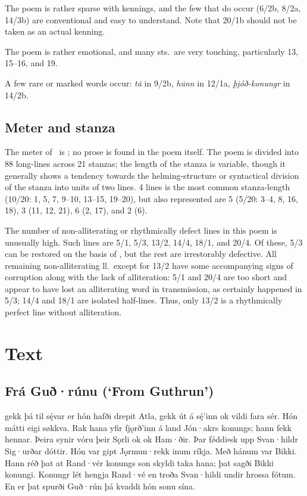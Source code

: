 The poem is rather sparse with kennings, and the few that do occur (6/2b, 8/2a, 14/3b) are conventional and easy to understand.  Note that 20/1b should not be taken as an actual kenning.

The poem is rather emotional, and many sts.~are very touching, particularly 13, 15--16, and 19.

A few rare or marked words occur: \emph{tȧ} in 9/2b, \emph{hu̇nn} in 12/1a, \emph{þjóð-konungr} in 14/2b.

\subsection{Meter and stanza}

The meter of \Gudrunarhvot\ is \Fornyrdislag; no prose is found in the poem itself.  The poem is divided into 88 long-lines across 21 stanzas; the length of the stanza is variable, though it generally shows a tendency towards the helming-structure or syntactical division of the stanza into units of two lines.  4 lines is the most common stanza-length (10/20: 1, 5, 7, 9--10, 13--15, 19--20), but also represented are 5 (5/20: 3--4, 8, 16, 18), 3 (11, 12, 21), 6 (2, 17), and 2 (6).

The number of non-alliterating or rhythmically defect lines in this poem is unusually high.  Such lines are 5/1, 5/3, 13/2, 14/4, 18/1, and 20/4.  Of these, 5/3 can be restored on the basis of \VolsungaSaga, but the rest are irrestorably defective.  All remaining non-alliterating ll.~except for 13/2 have some accompanying signs of corruption along with the lack of alliteration: 5/1 and 20/4 are too short and appear to have lost an alliterating word in transmission, as certainly happened in 5/3; 14/4 and 18/1 are isolated half-lines.  Thus, only 13/2 is a rhythmically perfect line without alliteration.

\sectionline

\newpage

\section{Text}

\subsection{Frá Guð·rúnu (‘From Guthrun’)}

\bpg\bpa{}%
 gekk þá til sę́var er hón hafði drepit Atla, gekk út á sę́’inn ok vildi fara sér. Hón mátti eigi søkkva. Rak hana yfir fjǫrð’inn á land Jón·akrs konungs; hann fekk hennar. Þeira synir vóru þeir Sǫrli ok  ok Ham·ðir. Þar fǿddi⸗sk upp Svan·hildr Sig·urðar dóttir. Hón var gipt Jǫrmun·rekk inum ríkja. Með hánum var Bikki. Hann réð þat at Rand·vér konungs son skyldi taka hana; þat sagði Bikki konungi. Konungr lét hengja Rand·vé en troða Svan·hildi undir hrossa fótum. En er þat spurði Guð·rún þá kvaddi hón sonu sína.\epa

